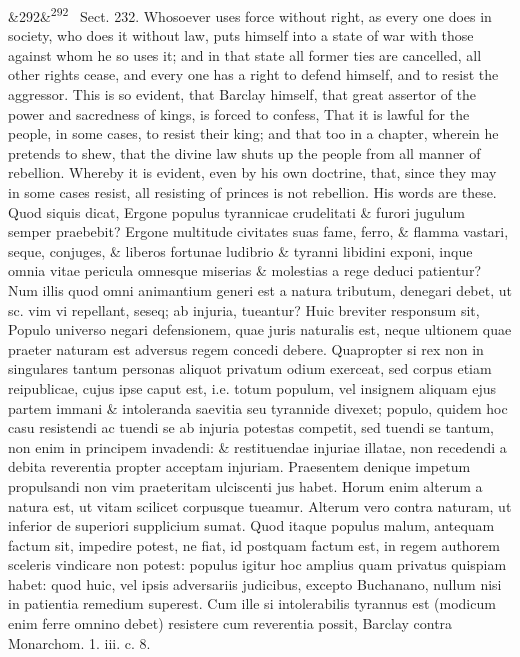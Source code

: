 \documentclass[12pt]{article}
\newcommand{\para}[1][]{\par\noindent\ifx&#1&\else\textsuperscript{\footnotesize #1}~\fi}
\begin{document}
\para[292] Sect. 232. Whosoever uses force without right, as every one does in society, who does it without law, puts himself into a state of war with those against whom he so uses it; and in that state all former ties are cancelled, all other rights cease, and every one has a right to defend himself, and to resist the aggressor. This is so evident, that Barclay himself, that great assertor of the power and sacredness of kings, is forced to confess, That it is lawful for the people, in some cases, to resist their king; and that too in a chapter, wherein he pretends to shew, that the divine law shuts up the people from all manner of rebellion. Whereby it is evident, even by his own doctrine, that, since they may in some cases resist, all resisting of princes is not rebellion. His words are these. Quod siquis dicat, Ergone populus tyrannicae crudelitati \& furori jugulum semper praebebit? Ergone multitude civitates suas fame, ferro, \& flamma vastari, seque, conjuges, \& liberos fortunae ludibrio \& tyranni libidini exponi, inque omnia vitae pericula omnesque miserias \& molestias a rege deduci patientur? Num illis quod omni animantium generi est a natura tributum, denegari debet, ut sc. vim vi repellant, seseq; ab injuria, tueantur? Huic breviter responsum sit, Populo universo negari defensionem, quae juris naturalis est, neque ultionem quae praeter naturam est adversus regem concedi debere. Quapropter si rex non in singulares tantum personas aliquot privatum odium exerceat, sed corpus etiam reipublicae, cujus ipse caput est, i.e. totum populum, vel insignem aliquam ejus partem immani \& intoleranda saevitia seu tyrannide divexet; populo, quidem hoc casu resistendi ac tuendi se ab injuria potestas competit, sed tuendi se tantum, non enim in principem invadendi: \& restituendae injuriae illatae, non recedendi a debita reverentia propter acceptam injuriam. Praesentem denique impetum propulsandi non vim praeteritam ulciscenti jus habet. Horum enim alterum a natura est, ut vitam scilicet corpusque tueamur. Alterum vero contra naturam, ut inferior de superiori supplicium sumat. Quod itaque populus malum, antequam factum sit, impedire potest, ne fiat, id postquam factum est, in regem authorem sceleris vindicare non potest: populus igitur hoc amplius quam privatus quispiam habet: quod huic, vel ipsis adversariis judicibus, excepto Buchanano, nullum nisi in patientia remedium superest. Cum ille si intolerabilis tyrannus est (modicum enim ferre omnino debet) resistere cum reverentia possit, Barclay contra Monarchom. 1. iii. c. 8.
\end{document}
